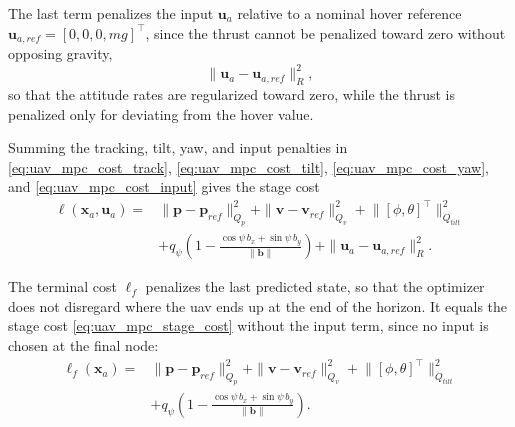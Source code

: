 The last term penalizes the input $\mathbf{u}_a$ relative to a nominal hover reference $\mathbf{u}_{a,ref} = [0,0,0,mg]^\top$, since the thrust cannot be penalized toward zero without opposing gravity,
\begin{equation}
    \|\mathbf{u}_a - \mathbf{u}_{a,ref}\|^2_{R},
    \label{eq:uav_mpc_cost_input}
\end{equation}
so that the attitude rates are regularized toward zero, while the thrust is penalized only for deviating from the hover value.

Summing the tracking, tilt, yaw, and input penalties in \eqref{eq:uav_mpc_cost_track}, \eqref{eq:uav_mpc_cost_tilt}, \eqref{eq:uav_mpc_cost_yaw}, and \eqref{eq:uav_mpc_cost_input} gives the stage cost
\begin{equation}
    \begin{aligned}
        \ell(\mathbf{x}_a,\mathbf{u}_a) = {} & \|\mathbf{p}-\mathbf{p}_{ref}\|^2_{Q_p} + \|\mathbf{v}-\mathbf{v}_{ref}\|^2_{Q_v} + \big\|[\phi,\theta]^\top\big\|^2_{Q_{tilt}} \\
        & + q_\psi\left(1 - \frac{\cos\psi\,b_x + \sin\psi\,b_y}{\|\mathbf{b}\|}\right) + \|\mathbf{u}_a-\mathbf{u}_{a,ref}\|^2_R.
    \end{aligned}
    \label{eq:uav_mpc_stage_cost}
\end{equation}

The terminal cost $\ell_f$ penalizes the last predicted state, so that the optimizer does not disregard where the \gls{uav} ends up at the end of the horizon. It equals the stage cost \eqref{eq:uav_mpc_stage_cost} without the input term, since no input is chosen at the final node:
\begin{equation}
    \begin{aligned}
        \ell_f(\mathbf{x}_a) = {} & \|\mathbf{p}-\mathbf{p}_{ref}\|^2_{Q_p} + \|\mathbf{v}-\mathbf{v}_{ref}\|^2_{Q_v} + \big\|[\phi,\theta]^\top\big\|^2_{Q_{tilt}} \\
        & + q_\psi\left(1 - \frac{\cos\psi\,b_x + \sin\psi\,b_y}{\|\mathbf{b}\|}\right).
    \end{aligned}
    \label{eq:uav_mpc_terminal_cost}
\end{equation}

